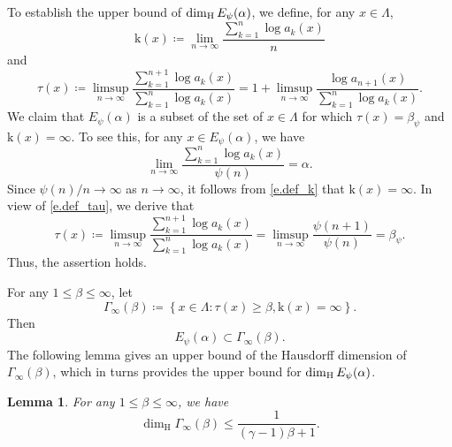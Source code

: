 \documentclass[12pt,reqno]{amsart}
\renewcommand{\=}{\coloneqq}
\theoremstyle{plain}
\newtheorem{lemma}[theorem]{Lemma}
\begin{document}
To establish the upper bound of $\dim_{\rm H}E_{\psi}(\alpha)$, we define, for any $x\in \Lambda$,
\begin{equation}\label{e.def_k}
        \mathrm{k} (x)\coloneqq\lim_{n\to \infty}
        \frac{\sum^n_{k=1}\log a_k(x)}{n}
\end{equation}
and
\begin{equation}\label{e.def_tau}
        \tau(x)\coloneqq \limsup_{n\to \infty}\frac
        {\sum^{n+1}_{k=1}\log a_k(x)}
        {\sum^n_{k=1}\log a_k(x)} =1+\limsup_{n\to \infty}
        \frac{\log a_{n+1}(x)}
        {\sum^n_{k=1}\log a_k(x)}.
\end{equation}
We claim that $E_{\psi}(\alpha)$ is a subset of the set of $x\in \Lambda$ for which $\tau(x)=\beta_\psi$ and $\mathrm{k} (x)=\infty$. To see this, for any $x\in E_{\psi}(\alpha)$, we have
\begin{equation*}
\lim_{n\to \infty}  \frac{\sum^n_{k=1}\log a_k(x)}{\psi(n)} =\alpha.
\end{equation*}
Since $\psi(n)/n \to \infty$ as $n\to \infty$, it follows from \eqref{e.def_k} that $\mathrm{k} (x)=\infty$. In view of \eqref{e.def_tau}, we derive that
\begin{equation*}
     \tau(x)\coloneqq  \limsup_{n\to \infty}\frac
        {\sum^{n+1}_{k=1}\log a_k(x)}
        {\sum^n_{k=1}\log a_k(x)}
        =\limsup_{n\to \infty}\frac{\psi(n+1)}{\psi(n)}
        =\beta_\psi.
\end{equation*}
Thus, the assertion holds.


For any $1\leq \beta \leq \infty$, let
 \begin{equation}\label{e.def_Gamma_infty_hat}
                \Gamma_{\infty}(\beta)\coloneqq
                \left\{x\in  \Lambda:\tau(x)\geq \beta,
                \mathrm{k} (x)=\infty\right\}.
        \end{equation}
Then
 \begin{equation}\label{RelEG}
 E_{\psi}(\alpha)\subset\Gamma_{\infty}(\beta).
\end{equation}
The following lemma gives an upper bound of the Hausdorff dimension of $\Gamma_{\infty}(\beta)$, which in turns provides the upper bound for $\dim_{\rm H}E_{\psi}(\alpha)$.


\begin{lemma}\label{l.Hausdorff_dimension_Gamma_infty} For any $1\leq \beta \leq \infty$, we have
        \begin{equation*}\label{e.upperboundGamma_infty}
\dim_{\mathrm{H}}{\Gamma}_{\infty}(\beta)
                \leq \frac{1}{(\gamma-1)\beta+1}.
        \end{equation*}
\end{lemma}
\end{document}
